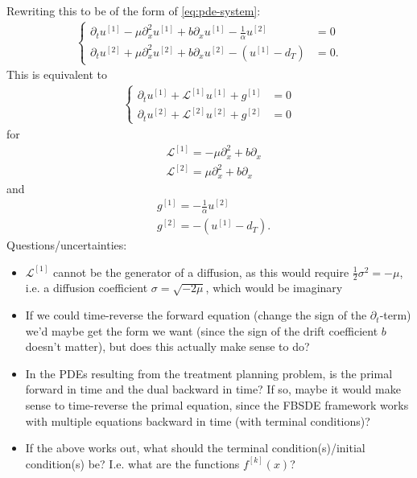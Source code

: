 \documentclass{article}  %
\begin{document}
Rewriting this to be of the form of \autoref{eq:pde-system}:
%
\begin{align}
    \begin{cases}
    \partial_t u^{[1]} - \mu \partial^2_x u^{[1]} + b \partial_x u^{[1]} - \frac{1}{\alpha} u^{[2]} &= 0 \\
    \partial_t u^{[2]} + \mu \partial_x^2 u^{[2]} + b \partial_x u^{[2]} - (u^{[1]} - d_T) &= 0.
    \end{cases}
\end{align}
%
This is equivalent to 
%
\begin{align} 
    \begin{cases}
    \partial_t u^{[1]} + \mathcal{L}^{[1]} u^{[1]} + g^{[1]} &= 0\\
    \partial_t u^{[2]} + \mathcal{L}^{[2]} u^{[2]} + g^{[2]} &= 0
    \end{cases}
\end{align}
%
for 
%
\begin{align} 
    &\mathcal{L}^{[1]} = - \mu \partial_x^2 + b \partial_x\\
    &\mathcal{L}^{[2]} = \mu \partial_x^2 + b \partial_x
\end{align}
%
and 
%
\begin{align} 
    &g^{[1]} = -\frac{1}{\alpha} u^{[2]}\\
    &g^{[2]} = -(u^{[1]}-d_T).
\end{align}
%
Questions/uncertainties:
\begin{itemize}
    \item $\mathcal{L}^{[1]}$ cannot be the generator of a diffusion, as this would require $\frac{1}{2}\sigma^2 = -\mu$, i.e. a diffusion coefficient $\sigma = \sqrt{-2\mu}$, which would be imaginary
    \item If we could time-reverse the forward equation (change the sign of the $\partial_t$-term) we'd maybe get the form we want (since the sign of the drift coefficient $b$ doesn't matter), but does this actually make sense to do?
    \item In the PDEs resulting from the treatment planning problem, is the primal forward in time and the dual backward in time? If so, maybe it would make sense to time-reverse the primal equation, since the FBSDE framework works with multiple equations backward in time (with terminal conditions)?
    \item If the above works out, what should the terminal condition(s)/initial condition(s) be? I.e. what are the functions $f^{[k]}(x)$?
\end{itemize}


% 
% 
\nocite{*}
\printbibliography
%
\end{document}
